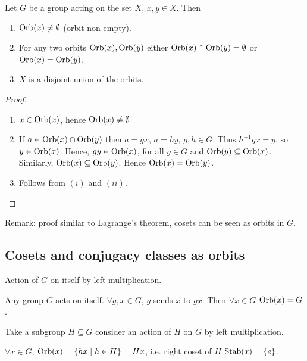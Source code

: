 \documentclass[10pt, a4paper]{article}
\begin{document}
\begin{proposition}
    Let $G$ be a group acting on the set $X$,
    $x, y \in X$.
    Then
    \begin{enumerate}[label = (\roman*)]
        \item $\operatorname{Orb}(x) \neq \emptyset$
        (orbit non-empty).

        \item For any two orbits $\operatorname{Orb}(x), \operatorname{Orb}(y)$ either $\operatorname{Orb}(x) \cap \operatorname{Orb}(y) = \emptyset$ or $\operatorname{Orb}(x) = \operatorname{Orb}(y)$.

        \item $X$ is a disjoint union of the orbits.
    \end{enumerate}

    \begin{proof}
        \begin{enumerate}[label = (\roman*)]
            \item $x \in \operatorname{Orb}(x)$,
            hence $\operatorname{Orb}(x) \neq \emptyset$
            \item If $a \in \operatorname{Orb}(x) \cap \operatorname{Orb}(y)$ then $a = gx$,
            $a = hy$,
            $g, h \in G$.
            Thus $h ^ {-1}gx = y$,
            so $y \in \operatorname{Orb}(x)$.
            Hence,
            $gy \in \operatorname{Orb}(x)$,
            for all $g \in G$ and $\operatorname{Orb}(y) \subseteq \operatorname{Orb}(x)$.
            Similarly,
            $\operatorname{Orb}(x) \subseteq \operatorname{Orb}(y)$.
            Hence $\operatorname{Orb}(x) = \operatorname{Orb}(y)$.

            \item Follows from $(i)$ and $(ii)$.
        \end{enumerate}
    \end{proof}
\end{proposition}
Remark:
proof similar to Lagrange's theorem,
cosets can be seen as orbits in $G$.

\subsection{Cosets and conjugacy classes as orbits}

Action of $G$ on itself by left multiplication.

Any group $G$ acts on itself.
$\forall g, x \in G$,
$g$ sends $x$ to $gx$.
Then $\forall x \in G$ $\operatorname{Orb}(x) = G$.


Take a subgroup $H \subseteq G$ consider an action of $H$ on $G$ by left multiplication.

$\forall x \in G$,
$\operatorname{Orb}(x) = \{hx \mid h \in H\} = Hx$,
i.e. right coset of $H$ $\operatorname{Stab}(x) = \{e\}$.
\end{document}
